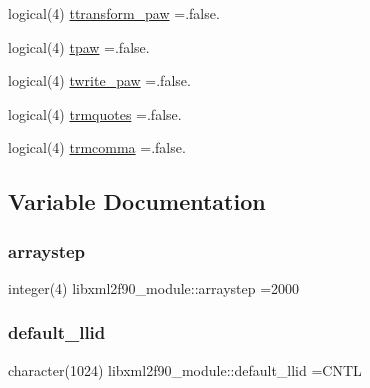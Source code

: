 \begin{DoxyCompactItemize}
\item 
logical(4) \hyperlink{namespacelibxml2f90__module_a57a7bbf9cf74f527371bfb5496135bdf}{ttransform\+\_\+paw} =.false.
\item 
logical(4) \hyperlink{namespacelibxml2f90__module_aaa46bc31e8406d83b035ff8b620563a8}{tpaw} =.false.
\item 
logical(4) \hyperlink{namespacelibxml2f90__module_aaba636a60c116ce3dfa158403414d3b1}{twrite\+\_\+paw} =.false.
\item 
logical(4) \hyperlink{namespacelibxml2f90__module_aa7358595240bdca537fc1e126fb8f6a8}{trmquotes} =.false.
\item 
logical(4) \hyperlink{namespacelibxml2f90__module_a01eddf97a14bcc393835cd086f78dfdf}{trmcomma} =.false.
\end{DoxyCompactItemize}


\subsection{Variable Documentation}
\mbox{\label{namespacelibxml2f90__module_a03a53e403791ec1e112a71f5f2831522}} 
\subsubsection{\texorpdfstring{arraystep}{arraystep}}
{\footnotesize\ttfamily integer(4) libxml2f90\+\_\+module\+::arraystep =2000}

\mbox{\label{namespacelibxml2f90__module_a2dc8e61fe0a8b9c60b5197984e7b30ae}} 
\subsubsection{\texorpdfstring{default\+\_\+llid}{default\_llid}}
{\footnotesize\ttfamily character(1024) libxml2f90\+\_\+module\+::default\+\_\+llid =\textquotesingle{}C\+N\+TL\textquotesingle{}}

\mbox{\label{namespacelibxml2f90__module_a63c8792c8a009d1875c66340984b0879}} 
